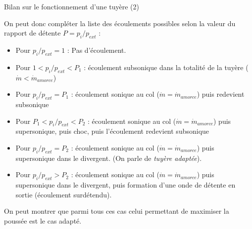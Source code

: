 \begin{frame}{Bilan sur le fonctionnement d'une tuyère (2)}


\small

On peut donc compléter la liste des écoulements possibles selon la valeur du rapport de détente $ P = p_i/p_{ext}$ :

\pause
\begin{itemize}

\item  Pour $p_i/p_{ext} = 1 $ :  Pas d'écoulement. 

\item Pour $1 < p_i/p_{ext} < P_1  $ : écoulement subsonique dans la totalité de la tuyère ($\dot m < {\dot m}_{amorce}$)

\item Pour $p_i/p_{ext} = P_1 $ : écoulement sonique au col ($\dot m = {\dot m}_{amorce}$) puis redevient subsonique 
 
 \item Pour $P_1<p_i /p_{ext} < P_2 $ : écoulement sonique au col ($\dot m = {\dot m}_{amorce}$)  puis supersonique, 
{\color{rouge}  puis choc}, puis l'écoulement redevient subsonique 
 
\item Pour $p_i /p_{ext} = P_2 $ : écoulement sonique au col ($\dot m = {\dot m}_{amorce}$)  puis supersonique dans le divergent.
(On parle de {\em tuyère adaptée}).

\item Pour $p_i /p_{ext} > P_2 $ : écoulement sonique au col ($\dot m = {\dot m}_{amorce}$)  puis supersonique dans le divergent, 
puis formation d'une onde de détente en sortie (écoulement surdétendu).


\end{itemize}
 
 On peut montrer que parmi tous ces cas celui permettant de maximiser la poussée est le cas adapté.

\end{frame}








